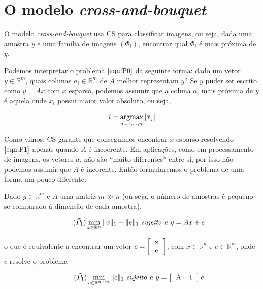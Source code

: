 \chapter{O modelo \textit{cross-and-bouquet}}


O modelo \textit{cross-and-bouquet} usa CS para classificar imagens, ou seja, dada uma amostra $y$ e uma família de imagens $(\Phi_i)$, encontrar qual $\Phi_i$ é mais próxima de $y$.

Podemos interpretar o problema $\eqref{eqn:P0}$ da seguinte forma: dado um vetor $y \in \mathbb{R}^m$, quais colunas $a_i \in \mathbb{R}^m$ de $A$ melhor representam $y$? Se $y$ puder ser escrito como $y = Ax$ com $x$ esparso, podemos assumir que a coluna $a_i$ mais próxima de $y$ é aquela onde $x_i$ possui maior valor absoluto, ou seja,

$$ i = \argmax_{j = 1, \hdots, n} \vert x_j \vert $$

Como vimos, CS garante que conseguimos encontrar $x$ esparso resolvendo $\eqref{eqn:P1}$ apenas quando $A$ é incoerente. Em aplicações, como em processamento de imagens, os vetores $a_i$ não são ``muito diferentes'' entre si, por isso não podemos assumir que $A$ é incorente. Então formularemos o problema de uma forma um pouco diferente:

Dado $y \in \mathbb{R}^m$ e $A$ uma matriz $m \gg n$ (ou seja, o número de amostras é pequeno se comparado à dimensão de cada amostra),

\begin{equation}
\tag{$\tilde{P_1}$}
\min_{x \in \mathbb{R}^n} \Vert x \Vert_{1} + \Vert e \Vert_{1} \textit{ sujeito a } y = Ax + e
\end{equation}

o que é equivalente a encontrar um vetor $c = \left[ \begin{tabular}{c}
x \\
e
\end{tabular} \right]$, com $x \in \mathbb{R}^n$ e $e \in \mathbb{R}^m$, onde $c$ resolve o problema

\begin{equation}
\tag{$\tilde{P_1}$}
\min_{c \in \mathbb{R}^{n + m}} \Vert c \Vert_{1} \textit{ sujeito a } y = \left[ \begin{tabular}{c c} A &  I \end{tabular} \right] c
\label{eqn:P1_tilde}
\end{equation}

